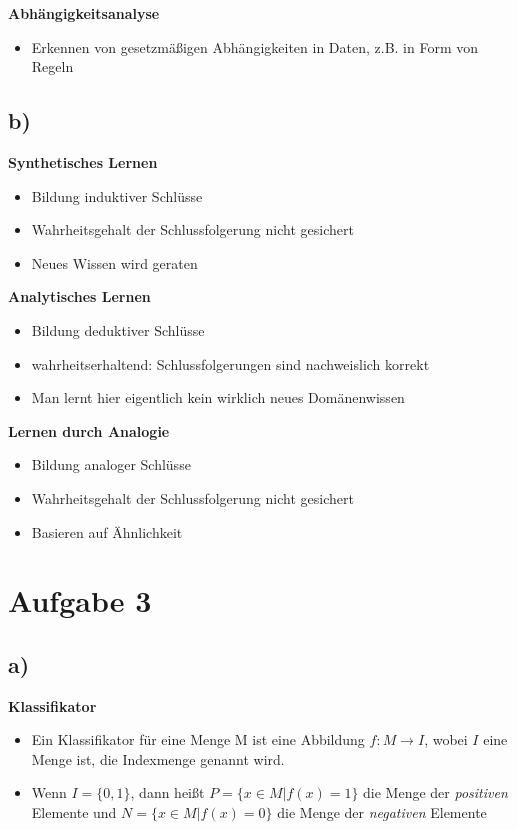 \documentclass[11pt,a4paper,parskip=half ]{scrartcl}
\begin{document}
	\textbf{Abhängigkeitsanalyse}\\
	\begin{itemize}
		\item Erkennen von gesetzmäßigen Abhängigkeiten in Daten, z.B. in Form von Regeln
	\end{itemize}
	
	\subsection*{b)}
	
	\textbf{Synthetisches Lernen}\\
	\begin{itemize}
		\item Bildung induktiver Schlüsse
		\item Wahrheitsgehalt der Schlussfolgerung nicht gesichert
		\item Neues Wissen wird geraten
	\end{itemize}
	
	\textbf{Analytisches Lernen}\\
	\begin{itemize}
		\item Bildung deduktiver Schlüsse
		\item wahrheitserhaltend: Schlussfolgerungen sind nachweislich korrekt
		\item Man lernt hier eigentlich kein wirklich neues Domänenwissen
	\end{itemize}
	
	\textbf{Lernen durch Analogie}\\
	\begin{itemize}
		\item Bildung analoger Schlüsse
		\item Wahrheitsgehalt der Schlussfolgerung nicht gesichert
		\item Basieren auf Ähnlichkeit
	\end{itemize}
		
	\section*{Aufgabe 3}
		\subsection*{a)}
			\textbf{Klassifikator}
			\begin{itemize}
				\item Ein Klassifikator für eine Menge M ist eine Abbildung $f : M \rightarrow I$, wobei $I$ eine Menge ist, die Indexmenge genannt wird.
				\item Wenn $I = \{0, 1\}$, dann heißt
				\subitem $P=\{x \in M | f(x) = 1\}$ die Menge der \textit{positiven} Elemente und
				\subitem $N=\{x \in M | f(x) = 0\}$ die Menge der \textit{negativen} Elemente
			\end{itemize}
		
\end{document}
